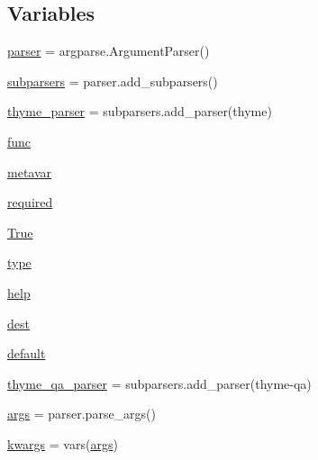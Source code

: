 \subsection*{Variables}
\begin{DoxyCompactItemize}
\item 
\hyperlink{namespacetask6_1_1anafora_1_1cleanup_ae914a59b099b3783a223659af3f58041}{parser} = argparse.\+Argument\+Parser()
\item 
\hyperlink{namespacetask6_1_1anafora_1_1cleanup_a7e1b25a9a5d884fd90c4e7932aa8fa3f}{subparsers} = parser.\+add\+\_\+subparsers()
\item 
\hyperlink{namespacetask6_1_1anafora_1_1cleanup_a68fb81f1e39b983db24716fd504098df}{thyme\+\_\+parser} = subparsers.\+add\+\_\+parser(\textquotesingle{}thyme\textquotesingle{})
\item 
\hyperlink{namespacetask6_1_1anafora_1_1cleanup_a07a9fa8644b7439d7f9dd5a06b87ee02}{func}
\item 
\hyperlink{namespacetask6_1_1anafora_1_1cleanup_aabaa420aa9177d39406cce248b7c2e56}{metavar}
\item 
\hyperlink{namespacetask6_1_1anafora_1_1cleanup_a3754b8ab02823a70571c2b47e3b5b064}{required}
\item 
\hyperlink{namespacetask6_1_1anafora_1_1cleanup_ac69ab9fbce7adef1e6381cfe516df519}{True}
\item 
\hyperlink{namespacetask6_1_1anafora_1_1cleanup_ac3626918af070d24f86842645a354f9f}{type}
\item 
\hyperlink{namespacetask6_1_1anafora_1_1cleanup_ae072044dbc76cda2017dbe674569eb21}{help}
\item 
\hyperlink{namespacetask6_1_1anafora_1_1cleanup_adfab330e8a60c554f7e360b56e3543fa}{dest}
\item 
\hyperlink{namespacetask6_1_1anafora_1_1cleanup_a8f82d28e68c8e010a9f7da2a1a727d9d}{default}
\item 
\hyperlink{namespacetask6_1_1anafora_1_1cleanup_ab9766ad37a4ece7fa1d9371417c90967}{thyme\+\_\+qa\+\_\+parser} = subparsers.\+add\+\_\+parser(\textquotesingle{}thyme-\/qa\textquotesingle{})
\item 
\hyperlink{namespacetask6_1_1anafora_1_1cleanup_a21aef80e0635aec95af03db18cc80952}{args} = parser.\+parse\+\_\+args()
\item 
\hyperlink{namespacetask6_1_1anafora_1_1cleanup_acba2f60b7ca920fa9bfb5d710c4d20ce}{kwargs} = vars(\hyperlink{namespacetask6_1_1anafora_1_1cleanup_a21aef80e0635aec95af03db18cc80952}{args})
\end{DoxyCompactItemize}


